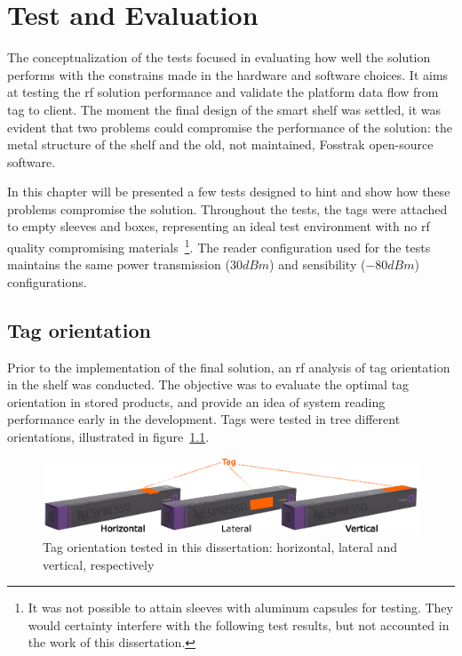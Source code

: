 \chapter{Test and Evaluation} \label{sec:tests}

The conceptualization of the tests focused in evaluating how well the solution performs with the constrains made in the hardware and software choices. It aims at testing the \ac{rf} solution performance and validate the platform data flow from tag to client.
The moment the final design of the smart shelf was settled, it was evident that two problems could compromise the performance of the solution: the metal structure of the shelf and the old, not maintained, Fosstrak open-source software.

In this chapter will be presented a few tests designed to hint and show how these problems compromise the solution. Throughout the tests, the tags were attached to empty sleeves and boxes, representing an ideal test environment with no \ac{rf} quality compromising materials~\footnote{It was not possible to attain sleeves with aluminum capsules for testing. They would certainty interfere with the following test results, but not accounted in the work of this dissertation.}.
The reader configuration used for the tests maintains the same power transmission ($30dBm$) and sensibility ($-80dBm$) configurations.

\section{Tag orientation} \label{sec:test1}

Prior to the implementation of the final solution, an \ac{rf} analysis of tag orientation in the shelf was conducted.
The objective was to evaluate the optimal tag orientation in stored products, and provide an idea of system reading performance early in the development.
Tags were tested in tree different orientations, illustrated in figure~\ref{fig:tagorientations}.

\begin{figure}
    \centering
    \includegraphics[width=\textwidth]{figs/tests/tag_positions.eps}
    \caption{Tag orientation tested in this dissertation: horizontal, lateral and vertical, respectively}
    \label{fig:tagorientations}
\end{figure}


